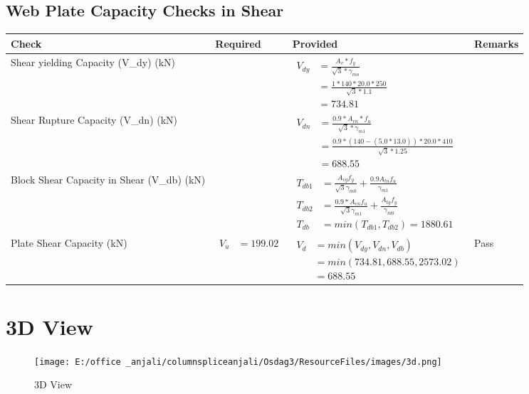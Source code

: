 \documentclass{article}%
\begin{document}
\subsection{Web Plate Capacity Checks in Shear}%
\label{subsec:WebPlateCapacityChecksinShear}%
\renewcommand{\arraystretch}{1.2}%
\begin{longtable}{|p{4cm}|p{6cm}|p{5.5cm}|p{1.5cm}|}%
\hline%
\rowcolor{OsdagGreen}%
Check&Required&Provided&Remarks\\%
\hline%
\endhead%
\hline%
Shear yielding Capacity (V\_dy) (kN)&&$\begin{aligned} V_{dy} &= \frac{A_v*f_y}{\sqrt{3}*\gamma_{mo}}\\ &=\frac{1*140*20.0*250}{\sqrt{3}*1.1}\\ &=734.81\end{aligned}$&\\%
\hline%
Shear Rupture Capacity (V\_dn) (kN)&&$\begin{aligned} V_{dn} &= \frac{0.9*A_{vn}*f_u}{\sqrt{3}*\gamma_{m1}}\\ &= \frac{0.9 *(140-(5.0*13.0))*20.0*410}{\sqrt{3}*1.25}\\ &=688.55\end{aligned}$&\\%
\hline%
Block Shear Capacity in Shear (V\_db) (kN)&&$\begin{aligned}T_{db1} &= \frac{A_{vg} f_{y}}{\sqrt{3} \gamma_{m0}} + \frac{0.9 A_{tn} f_{u}}{\gamma_{m1}}\\ T_{db2} &= \frac{0.9*A_{vn} f_{u}}{\sqrt{3} \gamma_{m1}} + \frac{A_{tg} f_{y}}{\gamma_{m0}}\\ T_{db} &= min(T_{db1}, T_{db2})= 1880.61\end{aligned}$&\\%
\hline%
Plate Shear Capacity (kN)&$\begin{aligned} V_u &=199.02\end{aligned}$&$\begin{aligned} V_d &= min(V_{dy},V_{dn},V_{db})\\ &= min(734.81,688.55,2573.02)\\ &=688.55\end{aligned}$&Pass\\%
\hline%
\end{longtable}

%
%
\newpage%
\section{3D View}%
\label{sec:3DView}%


\begin{figure}[h!]%
\centering%
\texttt{[image: E:/office \_anjali/columnspliceanjali/Osdag3/ResourceFiles/images/3d.png]}%
\caption{3D View}%
\end{figure}

%
\end{document}

